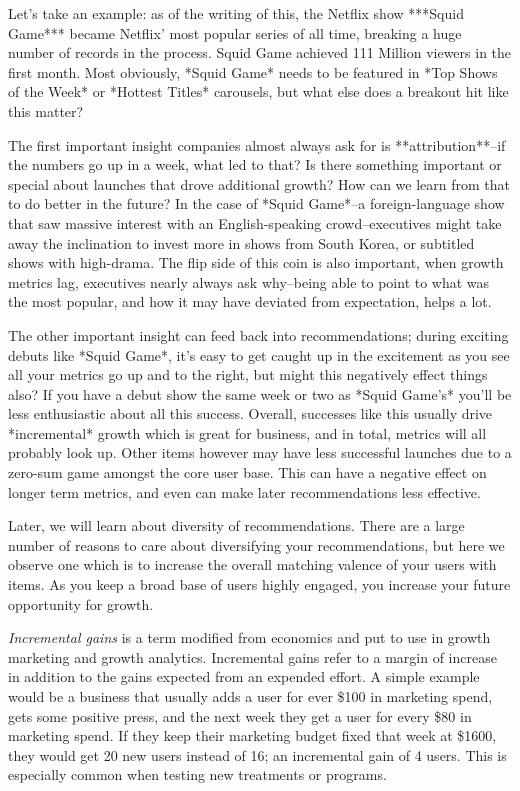 Let's take an example: as of the writing of this, the Netflix show ***Squid Game*** became Netflix' most popular series of all time, breaking a huge number of records in the process. Squid Game achieved 111 Million viewers in the first month. Most obviously, *Squid Game* needs to be featured in *Top Shows of the Week* or *Hottest Titles* carousels, but what else does a breakout hit like this matter?

The first important insight companies almost always ask for is **attribution**–if the numbers go up in a week, what led to that? Is there something important or special about launches that drove additional growth? How can we learn from that to do better in the future? In the case of *Squid Game*–a foreign-language show that saw massive interest with an English-speaking crowd–executives might take away the inclination to invest more in shows from South Korea, or subtitled shows with high-drama. The flip side of this coin is also important, when growth metrics lag, executives nearly always ask why–being able to point to what was the most popular, and how it may have deviated from expectation, helps a lot.

The other important insight can feed back into recommendations; during exciting debuts like *Squid Game*, it's easy to get caught up in the excitement as you see all your metrics go up and to the right, but might this negatively effect things also? If you have a debut show the same week or two as *Squid Game's* you'll be less enthusiastic about all this success. Overall, successes like this usually drive *incremental* growth which is great for business, and in total, metrics will all probably look up. Other items however may have less successful launches due to a zero-sum game amongst the core user base. This can have a negative effect on longer term metrics, and even can make later recommendations less effective. 

Later, we will learn about diversity of recommendations. There are a large number of reasons to care about diversifying your recommendations, but here we observe one which is to increase the overall matching valence of your users with items. As you keep a broad base of users highly engaged, you increase your future opportunity for growth.

\vspace{10pt}
\colorbox{almond}{\parbox{\textwidth-20pt}{ \emph{Incremental gains} is a term modified from economics and put to use in growth marketing and growth analytics. Incremental gains refer to a margin of increase in addition to the gains expected from an expended effort. A simple example would be a business that usually adds a user for ever \$100 in marketing spend, gets some positive press, and the next week they get a user for every \$80 in marketing spend. If they keep their marketing budget fixed that week at \$1600, they would get 20 new users instead of 16; an incremental gain of 4 users. This is especially common when testing new treatments or programs.
}}

